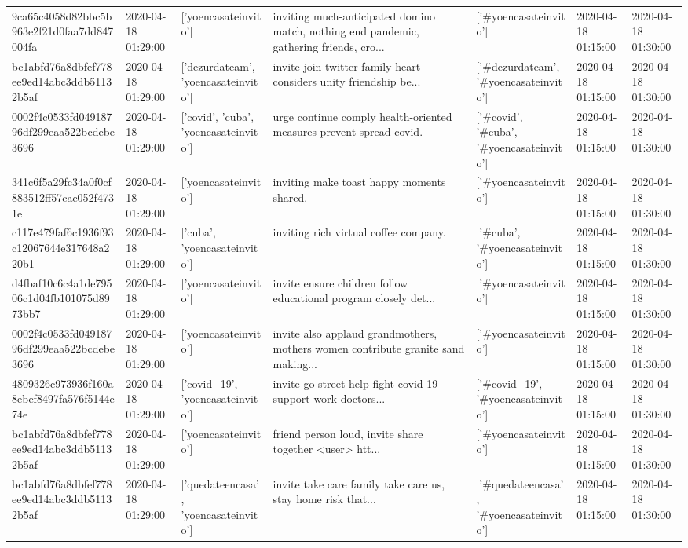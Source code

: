 \begin{tabular}{lllllll}
9ca65c4058d82bbc5b963e2f21d0faa7dd847004fa & 2020-04-18 01:29:00 & ['yoencasateinvito'] & inviting much-anticipated domino match, nothing end pandemic, gathering friends, cro... & ['#yoencasateinvito'] & 2020-04-18 01:15:00 & 2020-04-18 01:30:00 \\
bc1abfd76a8dbfef778ee9ed14abc3ddb51132b5af & 2020-04-18 01:29:00 & ['dezurdateam', 'yoencasateinvito'] & invite join twitter family heart considers unity friendship be... & ['#dezurdateam', '#yoencasateinvito'] & 2020-04-18 01:15:00 & 2020-04-18 01:30:00 \\
0002f4c0533fd04918796df299eaa522bcdebe3696 & 2020-04-18 01:29:00 & ['covid', 'cuba', 'yoencasateinvito'] & urge continue comply health-oriented measures prevent spread covid. & ['#covid', '#cuba', '#yoencasateinvito'] & 2020-04-18 01:15:00 & 2020-04-18 01:30:00 \\
341c6f5a29fc34a0f0cf883512ff57cae052f4731e & 2020-04-18 01:29:00 & ['yoencasateinvito'] & inviting make toast happy moments shared. & ['#yoencasateinvito'] & 2020-04-18 01:15:00 & 2020-04-18 01:30:00 \\
c117e479faf6c1936f93c12067644e317648a220b1 & 2020-04-18 01:29:00 & ['cuba', 'yoencasateinvito'] & inviting rich virtual coffee company. & ['#cuba', '#yoencasateinvito'] & 2020-04-18 01:15:00 & 2020-04-18 01:30:00 \\
d4fbaf10c6c4a1de79506c1d04fb101075d8973bb7 & 2020-04-18 01:29:00 & ['yoencasateinvito'] & invite ensure children follow educational program closely det... & ['#yoencasateinvito'] & 2020-04-18 01:15:00 & 2020-04-18 01:30:00 \\
0002f4c0533fd04918796df299eaa522bcdebe3696 & 2020-04-18 01:29:00 & ['yoencasateinvito'] & invite also applaud grandmothers, mothers women contribute granite sand making... & ['#yoencasateinvito'] & 2020-04-18 01:15:00 & 2020-04-18 01:30:00 \\
4809326c973936f160a8ebef8497fa576f5144e74e & 2020-04-18 01:29:00 & ['covid_19', 'yoencasateinvito'] & invite go street help fight covid-19 support work doctors... & ['#covid_19', '#yoencasateinvito'] & 2020-04-18 01:15:00 & 2020-04-18 01:30:00 \\
bc1abfd76a8dbfef778ee9ed14abc3ddb51132b5af & 2020-04-18 01:29:00 & ['yoencasateinvito'] & friend person loud, invite share together <user> htt... & ['#yoencasateinvito'] & 2020-04-18 01:15:00 & 2020-04-18 01:30:00 \\
bc1abfd76a8dbfef778ee9ed14abc3ddb51132b5af & 2020-04-18 01:29:00 & ['quedateencasa', 'yoencasateinvito'] & invite take care family take care us, stay home risk that... & ['#quedateencasa', '#yoencasateinvito'] & 2020-04-18 01:15:00 & 2020-04-18 01:30:00 \\

\end{tabular}
